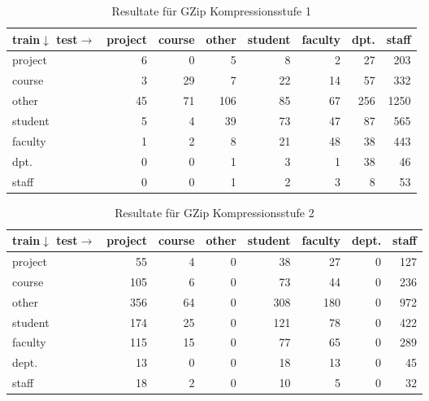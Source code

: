 \begin{frame}[c]
\begin{itemize}
 \begin{table}[htbp]
\begin{tabular}{|l|r|r|r|r|r|r|r|}
\hline
train$\downarrow$ test$\rightarrow$& \multicolumn{1}{l|}{project} &
\multicolumn{1}{l|}{course} & \multicolumn{1}{l|}{other} & \multicolumn{1}{l|}{student} &
\multicolumn{1}{l|}{faculty} & \multicolumn{1}{l|}{dpt.} &
\multicolumn{1}{l|}{staff} \\ \hline project & 6 & 0 & 5 & 8 & 2 & 27 & 203 \\ \hline course & 3 & 29 & 7 & 22 & 14 & 57 & 332 \\ \hline other & 45 & 71 & 106 & 85 & 67 & 256 & 1250 \\ \hline
student & 5 & 4 & 39 & 73 & 47 & 87 & 565 \\ \hline
faculty & 1 & 2 & 8 & 21 & 48 & 38 & 443 \\ \hline
dpt. & 0 & 0 & 1 & 3 & 1 & 38 & 46 \\ \hline
staff & 0 & 0 & 1 & 2 & 3 & 8 & 53 \\ \hline
\end{tabular}
\caption{Resultate für GZip Kompressionsstufe 1}
\label{tbl:GzipL1}
\end{table}
 
\end{itemize}
\end{frame}

\begin{frame}[c]
\begin{itemize}
  \begin{table}[htbp]
\caption{Resultate für GZip Kompressionsstufe 2}
\begin{tabular}{|l|r|r|r|r|r|r|r|}
\hline
train$\downarrow$ test$\rightarrow$& \multicolumn{1}{l|}{project} & \multicolumn{1}{l|}{course} &
\multicolumn{1}{l|}{other} & \multicolumn{1}{l|}{student} &
\multicolumn{1}{l|}{faculty} & \multicolumn{1}{l|}{dept.} &
\multicolumn{1}{l|}{staff} \\ \hline project & 55 & 4 & 0 & 38 & 27 & 0 & 127 \\ \hline course & 105 & 6 & 0 & 73 & 44 & 0 & 236 \\ \hline other & 356 & 64 & 0 & 308 & 180 & 0 & 972 \\ \hline
student & 174 & 25 & 0 & 121 & 78 & 0 & 422 \\ \hline
faculty & 115 & 15 & 0 & 77 & 65 & 0 & 289 \\ \hline
dept. & 13 & 0 & 0 & 18 & 13 & 0 & 45 \\ \hline
staff & 18 & 2 & 0 & 10 & 5 & 0 & 32 \\ \hline
\end{tabular}
\label{tbl:GzipL2}
\end{table}
  
   
\end{itemize}
\end{frame}

